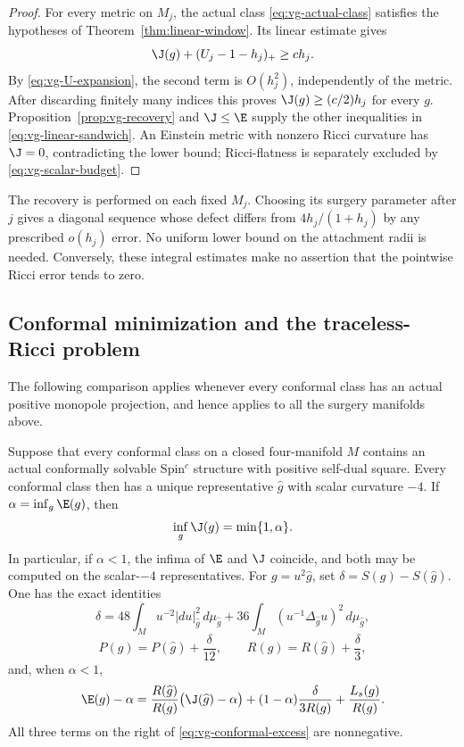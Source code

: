 \begin{proof}
For every metric on $M_j$, the actual class
\eqref{eq:vg-actual-class} satisfies the hypotheses of
Theorem~\ref{thm:linear-window}.  Its linear estimate gives
\[
 \J(g)+(U_j-1-h_j)_+\geq c h_j.
\]
By \eqref{eq:vg-U-expansion}, the second term is $O(h_j^2)$, independently
of the metric.  After discarding finitely many indices this proves
$\J(g)\geq(c/2)h_j$ for every $g$.  Proposition~\ref{prop:vg-recovery}
and $\J\leq\E$ supply the other inequalities in
\eqref{eq:vg-linear-sandwich}.  An Einstein metric with nonzero Ricci
curvature has $\J=0$, contradicting the lower bound; Ricci-flatness
is separately excluded by \eqref{eq:vg-scalar-budget}.
\end{proof}

The recovery is performed on each fixed $M_j$.  Choosing its surgery
parameter after $j$ gives a diagonal sequence whose defect differs from
$4h_j/(1+h_j)$ by any prescribed $o(h_j)$ error.  No uniform lower
bound on the attachment radii is needed.  Conversely, these integral
estimates make no assertion that the pointwise Ricci error tends to zero.

\subsection{Conformal minimization and the traceless-Ricci problem}

The following comparison applies whenever every conformal class has an
actual positive monopole projection, and hence applies to all the surgery
manifolds above.

\begin{proposition}\label{prop:vg-conformal-infimum}
Suppose that every conformal class on a closed four-manifold $M$ contains
an actual conformally solvable Spin$^c$ structure with positive self-dual
square.  Every conformal class then has a unique representative
$\widehat g$ with scalar curvature $-4$.  If
$\alpha=\inf_g\E(g)$, then
\begin{equation}\label{eq:vg-infima-exact}
 \inf_g\J(g)=\min\{1,\alpha\}.
\end{equation}
In particular, if $\alpha<1$, the infima of $\E$ and $\J$ coincide,
and both may be computed on the scalar-$-4$ representatives.
For $g=u^2\widehat g$, set $\delta=S(g)-S(\widehat g)$.  One has the
exact identities
\begin{equation}\label{eq:vg-conformal-scalar}
 \delta=48\int_Mu^{-2}|du|_{\widehat g}^2\,d\mu_{\widehat g}
       +36\int_M(u^{-1}\Delta_{\widehat g}u)^2\,d\mu_{\widehat g},
\end{equation}
\begin{equation}\label{eq:vg-conformal-P-R}
 P(g)=P(\widehat g)+\frac\delta{12},\qquad
 R(g)=R(\widehat g)+\frac\delta3,
\end{equation}
and, when $\alpha<1$,
\begin{equation}\label{eq:vg-conformal-excess}
 \E(g)-\alpha
 =\frac{R(\widehat g)}{R(g)}\bigl(\J(\widehat g)-\alpha\bigr)
     +(1-\alpha)\frac{\delta}{3R(g)}+\frac{L_s(g)}{R(g)}.
\end{equation}
All three terms on the right of \eqref{eq:vg-conformal-excess} are
nonnegative.
\end{proposition}

